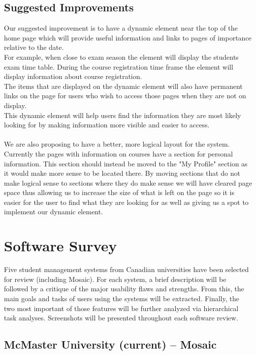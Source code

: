 \documentclass[10pt]{article}
\begin{document}
\begin{multicols}{2}
\subsection*{Suggested Improvements}
Our suggested improvement is to have a dynamic element near the top of the home page which will provide useful information and links to pages of importance relative to the date.\\
For example, when close to exam season the element will display the students exam time table. During the course registration time frame the element will display information about course registration.\\
The items that are displayed on the dynamic element will also have permanent links on the page for users who wish to access those pages when they are not on display. \\
This dynamic element will help users find the information they are most likely looking for by making information more visible and easier to access. \\ \\

We are also proposing to have a better, more logical layout for the system. Currently the pages with information on courses have a section for personal information. This section should instead be moved to the "My Profile" section as it would make more sense to be located there. By moving sections that do not make logical sense to sections where they do make sense we will have cleared page space thus allowing us to increase the size of what is left on the page so it is easier for the user to find what they are looking for as well as giving us a spot to implement our dynamic element. 

\section*{Software Survey}
Five student management systems from Canadian universities have been selected for review (including Mosaic). For each system, a brief description will be followed by a critique of the major usability flaws and strengths. From this, the main goals and tasks of users using the systems will be extracted. Finally, the two most important of those features will be further analyzed via hierarchical task analyses. Screenshots will be presented throughout each software review.

\subsection*{McMaster University (current) -- Mosaic}

\end{multicols}
\end{document}
